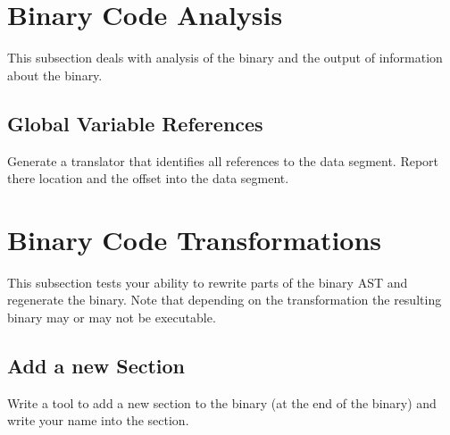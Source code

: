 \section{Binary Code Analysis}
   This subsection deals with analysis of the binary and the
output of information about the binary.

\subsection{Global Variable References}
   Generate a translator that identifies all references to the data segment.
Report there location and the offset into the data segment.



\section{Binary Code Transformations}
   This subsection tests your ability to rewrite parts of the binary
AST and regenerate the binary.  Note that depending on the transformation
the resulting binary may or may not be executable.

\subsection{Add a new Section}
   Write a tool to add a new section to the binary (at the end of the
binary) and write your name into the section.



